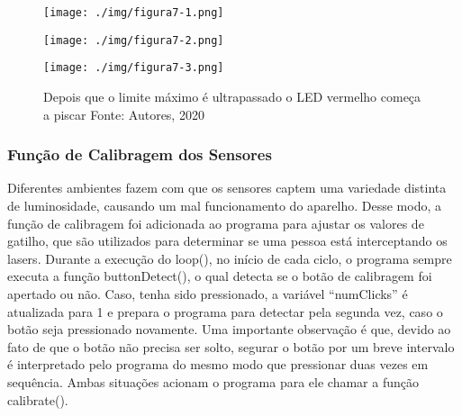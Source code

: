 \documentclass[10pt,twocolumn,letterpaper]{article}
\begin{document}
{
\begin{figure}[h]
    \begin{minipage}[!]{0.3\linewidth}
    \texttt{[image: ./img/figura7-1.png]}
    \end{minipage}
    \begin{minipage}[!]{0.28\linewidth}
    \texttt{[image: ./img/figura7-2.png]}
    \end{minipage}
    \begin{minipage}[!]{0.3\linewidth}
    \texttt{[image: ./img/figura7-3.png]}
    \end{minipage}
    \caption{ Depois que o limite máximo é ultrapassado o LED vermelho começa a piscar Fonte: Autores, 2020}
\label{fig:figura7}
\end{figure}
}

\subsubsection{Função de Calibragem dos Sensores}

Diferentes ambientes fazem com que os sensores captem uma variedade distinta de luminosidade, causando um mal funcionamento do aparelho. Desse modo, a função de calibragem foi adicionada ao programa para ajustar os valores de gatilho, que são utilizados para determinar se uma pessoa está interceptando os lasers. Durante a execução do loop(), no início de cada ciclo, o programa sempre executa a função buttonDetect(), o qual detecta se o botão de calibragem foi apertado ou não. Caso, tenha sido pressionado, a variável “numClicks” é atualizada para 1 e prepara o programa para detectar pela segunda vez, caso o botão seja pressionado novamente. Uma importante observação é que, devido ao fato de que o botão não precisa ser solto, segurar o botão por um breve intervalo é interpretado pelo programa do mesmo modo que pressionar duas vezes em sequência. Ambas situações acionam o programa para ele chamar a função calibrate(). 
\end{document}
